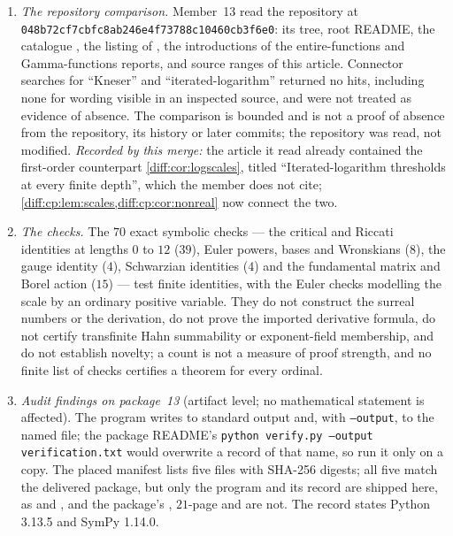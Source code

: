 \documentclass[11pt,letterpaper]{article}
\numberwithin{equation}{section}
\theoremstyle{definition}
\theoremstyle{remark}
\newcommand{\CommitD}{\nolinkurl{048b72cf7cbfc8ab246e4f73788c10460cb3f6e0}}
\begin{document}
\begin{enumerate}[label=\textup{N\arabic*.},leftmargin=3.0em,itemsep=0.35em,start=95]
Priority is provisional: the literature search was targeted and did not
certify exhaustive coverage, an expert may recognize a conclusion as a known
consequence of a broader theorem, and the arguments do not depend on the
novelty assessment. No named published conjecture is claimed resolved. No
independent refereeing, no proof-assistant verification and no Lean
implementation is claimed. This report itself makes no novelty claim
(item~N9).
\item \emph{The repository comparison.} Member~13 read the repository at
\CommitD: its tree, root README, the catalogue , the listing
of , the introductions of the entire-functions and
Gamma-functions reports, and source ranges of this article. Connector searches
for ``Kneser'' and ``iterated-logarithm'' returned no hits, including none for
wording visible in an inspected source, and were not treated as evidence of
absence. The comparison is bounded and is not a proof of absence from the
repository, its history or later commits; the repository was read, not
modified. \emph{Recorded by this merge:} the article it read already
contained the first-order counterpart \cref{diff:cor:logscales}, titled
``Iterated-logarithm thresholds at every finite depth'', which the member does
not cite; \cref{diff:cp:lem:scales,diff:cp:cor:nonreal} now connect the two.
\item \emph{The checks.} The $70$ exact symbolic checks --- the critical and
Riccati identities at lengths $0$ to $12$ ($39$), Euler powers, bases and
Wronskians ($8$), the gauge identity ($4$), Schwarzian identities ($4$) and the
fundamental matrix and Borel action ($15$) --- test finite identities, with the
Euler checks modelling the scale by an ordinary positive variable. They do not
construct the surreal numbers or the derivation, do not prove the imported
derivative formula, do not certify transfinite Hahn summability or
exponent-field membership, and do not establish novelty; a count is not a
measure of proof strength, and no finite list of checks certifies a theorem for
every ordinal.
\item \emph{Audit findings on package~13} (artifact level; no mathematical
statement is affected). The program writes to standard output and, with
\texttt{--output}, to the named file; the package README's
\texttt{python verify.py --output verification.txt} would overwrite a record
of that name, so run it only on a copy. The placed manifest
 lists five files with SHA-256
digests; all five match the delivered package, but only the program and its
record are shipped here, as  and
, and the package's
, $21$-page  and  are not.
The record states Python 3.13.5 and SymPy 1.14.0.
\end{enumerate}
\end{document}
